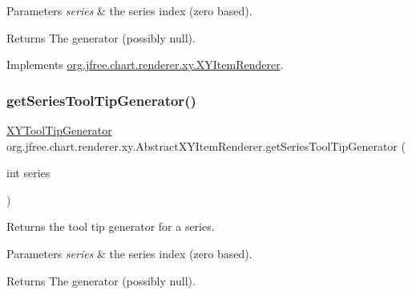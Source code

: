 \begin{DoxyParams}{Parameters}
{\em series} & the series index (zero based).\\
\hline
\end{DoxyParams}
\begin{DoxyReturn}{Returns}
The generator (possibly {\ttfamily null}). 
\end{DoxyReturn}


Implements \mbox{\hyperlink{interfaceorg_1_1jfree_1_1chart_1_1renderer_1_1xy_1_1_x_y_item_renderer_a1e5440f518283fdbc088ce0aad7002c3}{org.\+jfree.\+chart.\+renderer.\+xy.\+X\+Y\+Item\+Renderer}}.

\mbox{\label{classorg_1_1jfree_1_1chart_1_1renderer_1_1xy_1_1_abstract_x_y_item_renderer_a3c3f7975bbf00e6cc660138ce51f517c}} 
\subsubsection{\texorpdfstring{get\+Series\+Tool\+Tip\+Generator()}{getSeriesToolTipGenerator()}}
{\footnotesize\ttfamily \mbox{\hyperlink{interfaceorg_1_1jfree_1_1chart_1_1labels_1_1_x_y_tool_tip_generator}{X\+Y\+Tool\+Tip\+Generator}} org.\+jfree.\+chart.\+renderer.\+xy.\+Abstract\+X\+Y\+Item\+Renderer.\+get\+Series\+Tool\+Tip\+Generator (\begin{DoxyParamCaption}\item[{int}]{series }\end{DoxyParamCaption})}

Returns the tool tip generator for a series.


\begin{DoxyParams}{Parameters}
{\em series} & the series index (zero based).\\
\hline
\end{DoxyParams}
\begin{DoxyReturn}{Returns}
The generator (possibly {\ttfamily null}). 
\end{DoxyReturn}


